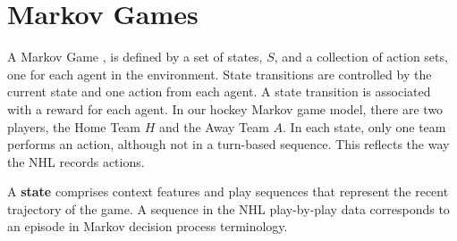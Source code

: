 \documentclass[runningheads,a4paper]{llncs}
\newcommand{\mstates}{S} %
\newcommand{\home}{H}
\newcommand{\away}{A}
\newcommand{\GD}{\it{GD}}
\newcommand{\MD}{\it{MD}}
\newcommand{\period}{\it{P}}
\begin{document}
\section{Markov Games}
A Markov Game \cite{Littman1994}, is defined by a set of states, $\mstates$, and a collection of action sets, one for each agent in the environment. State transitions are controlled by the current state and one action from each agent. A state transition is associated with a reward for each agent. In our hockey Markov game model, there are two players, the Home Team $\home$ and the Away Team $\away$.
%
In each state, only one team performs an action, although not in a turn-based sequence.
This reflects the way the NHL records actions.
%

A \textbf{state} comprises context features and play sequences that represent the recent trajectory of the game. A sequence in the NHL play-by-play data corresponds to an episode in Markov decision process terminology.

\end{document}
